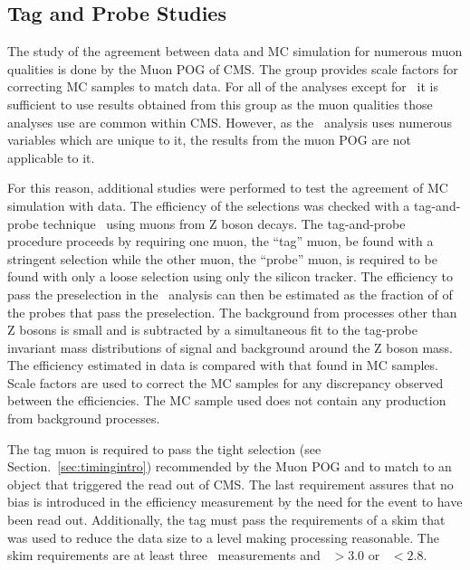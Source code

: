 \subsection{Tag and Probe Studies \label{sec:TagProbe}}
The study of the agreement between data and MC simulation for numerous muon qualities is done by the Muon POG of CMS.
The group provides scale factors for correcting MC samples to match data.
For all of the analyses except for \muononly\  it is sufficient to use results obtained from this group as the muon qualities
those analyses use are common within CMS.
However, as the \muononly\ analysis uses numerous variables which are unique to it, the results from the muon POG are not applicable to it.

For this reason, additional studies were performed to test the agreement of MC simulation with data.
The efficiency of the selections was checked with a tag-and-probe technique~\cite{2012JInst...7P0002T} using muons from Z boson decays.
The tag-and-probe procedure proceeds by requiring one muon, the ``tag'' muon, be found with a stringent selection while the other muon, the ``probe'' muon,
is required to be found with only a loose selection using only the silicon tracker. The efficiency to pass the preselection in the \muononly\ analysis
can then be estimated as the fraction of of the probes that pass the preselection. The background from processes other than Z bosons is small and is subtracted by
a simultaneous fit to the tag-probe invariant mass distributions of signal and background around the Z boson mass.
The efficiency estimated in data is compared with that found in MC samples. Scale factors are used to correct the MC samples for any discrepancy observed between the efficiencies.
The MC sample used does not contain any production from background processes.

The tag muon is required to pass the tight selection (see Section.~\ref{sec:timingintro}) recommended by the Muon POG and to match to an object that triggered the read out of CMS. 
The last requirement assures that no bias is introduced in the efficiency measurement by the need for the event to have been read out.
Additionally, the tag must pass the requirements of a skim that was used to reduce the data size to a level
making processing reasonable. The skim requirements are at least three \dedx\ measurements and \ih\ $> 3.0$ or \ih\ $< 2.8$.

